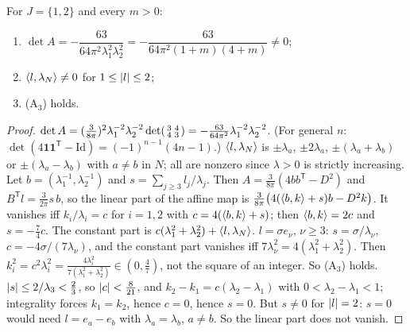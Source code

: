 \begin{theorem}[Nondegeneracy, (e)]\label{bpW:w0n:nondeg}
For $J=\{1,2\}$ and every $m>0$:
\begin{enumerate}[label=(\roman*)]
\item $\det A=-\dfrac{63}{64\pi^2\lambda_1^2\lambda_2^2}=-\dfrac{63}{64\pi^2(1+m)(4+m)}\neq0$;
\item $\langle l,\lambda_N\rangle\neq0$ for $1\le\lvert l\rvert\le2$;
\item (A$_3$) holds.
\end{enumerate}
\end{theorem}

\begin{proof}
\label{stepW:w0n:det}
$\det A=(\tfrac3{8\pi})^2\lambda_1^{-2}\lambda_2^{-2}\det\begin{psmallmatrix}3&4\\4&3\end{psmallmatrix}=
-\tfrac{63}{64\pi^2}\lambda_1^{-2}\lambda_2^{-2}$. (For general $n$: $\det(4\mathbf1\mathbf1^{\mathsf T}-\mathrm{Id})=
(-1)^{n-1}(4n-1)$.)
\label{stepW:w0n:A2}
$\langle l,\lambda_N\rangle$ is $\pm\lambda_a$, $\pm2\lambda_a$, $\pm(\lambda_a+\lambda_b)$ or $\pm(\lambda_a-\lambda_b)$ with
$a\neq b$ in $N$; all are nonzero since $\lambda>0$ is strictly increasing.
\label{stepW:w0n:A3red}
Let $b=(\lambda_1^{-1},\lambda_2^{-1})$ and $s=\sum_{j\ge3}l_j/\lambda_j$. Then
$A=\frac3{8\pi}(4bb^{\mathsf T}-D^2)$ and $B^{\mathsf T}l=\frac{3}{2\pi}s\,b$, so the linear part of the affine map
is $\frac{3}{8\pi}\bigl(4(\langle b,k\rangle+s)b-D^2k\bigr)$. It vanishes iff $k_i/\lambda_i=c$ for $i=1,2$ with
$c=4(\langle b,k\rangle+s)$; then $\langle b,k\rangle=2c$ and $s=-\frac74c$. The constant part is
$c(\lambda_1^2+\lambda_2^2)+\langle l,\lambda_N\rangle$.
\label{stepW:w0n:l1}
$l=\sigma e_\nu$, $\nu\ge3$: $s=\sigma/\lambda_\nu$, $c=-4\sigma/(7\lambda_\nu)$, and the constant part vanishes iff
$7\lambda_\nu^2=4(\lambda_1^2+\lambda_2^2)$. Then $k_i^2=c^2\lambda_i^2=\frac{4\lambda_i^2}{7(\lambda_1^2+\lambda_2^2)}
\in(0,\frac47)$, not the square of an integer. So (A$_3$) holds.
\label{stepW:w0n:l2}
$\lvert s\rvert\le2/\lambda_3<\frac23$, so $\lvert c\rvert<\frac{8}{21}$, and $k_2-k_1=c(\lambda_2-\lambda_1)$ with
$0<\lambda_2-\lambda_1<1$; integrality forces $k_1=k_2$, hence $c=0$, hence $s=0$. But $s\ne0$ for $\lvert l\rvert=2$: $s=0$
would need $l=e_a-e_b$ with $\lambda_a=\lambda_b$, $a\neq b$. So the linear part does not vanish.
\end{proof}

